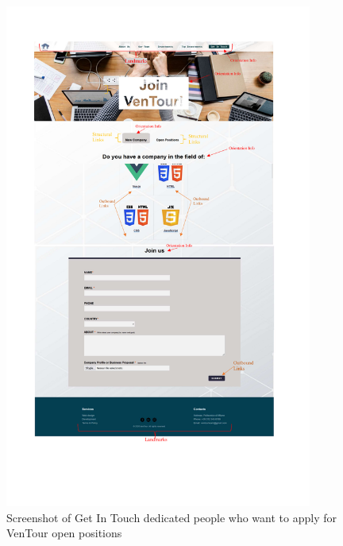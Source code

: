 \documentclass[../../DD.tex]{subsubfiles}
\begin{document}
        \begin{figure}[!htb]
		    \centering
		    \includegraphics[width=0.9\textwidth, trim=0 110 0 80, clip]{Images/screenshots/Get In Touch2.pdf}
		    \caption{Screenshot of Get In Touch dedicated people who want to apply for VenTour open positions}
		    \label{fig: GitApp}
		\end{figure}
  \clearpage
\end{document}
